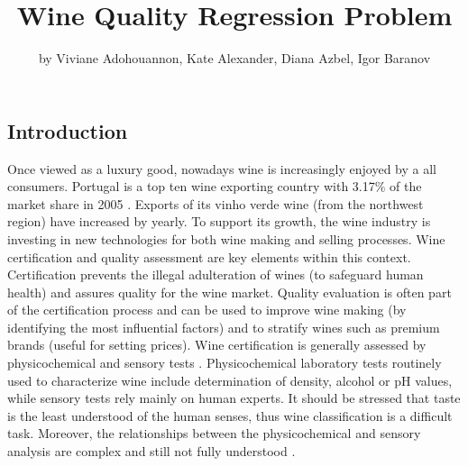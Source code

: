\title{Wine Quality Regression Problem}
\author{by Viviane Adohouannon, Kate Alexander, Diana Azbel, Igor Baranov}

\maketitle



\hypertarget{introduction}{%
\subsection{Introduction}\label{introduction}}

Once viewed as a luxury good, nowadays wine is increasingly enjoyed by a
all consumers. Portugal is a top ten wine exporting country with 3.17\%
of the market share in 2005 \citep{faostat}. Exports of its vinho verde
wine (from the northwest region) have increased by yearly. To support
its growth, the wine industry is investing in new technologies for both
wine making and selling processes. Wine certification and quality
assessment are key elements within this context. Certification prevents
the illegal adulteration of wines (to safeguard human health) and
assures quality for the wine market. Quality evaluation is often part of
the certification process and can be used to improve wine making (by
identifying the most influential factors) and to stratify wines such as
premium brands (useful for setting prices). Wine certification is
generally assessed by physicochemical and sensory tests
\citep{teranishi_flavor_1999}. Physicochemical laboratory tests
routinely used to characterize wine include determination of density,
alcohol or pH values, while sensory tests rely mainly on human experts.
It should be stressed that taste is the least understood of the human
senses, thus wine classification is a difficult task. Moreover, the
relationships between the physicochemical and sensory analysis are
complex and still not fully understood \citep{legin_evaluation_2003}.

